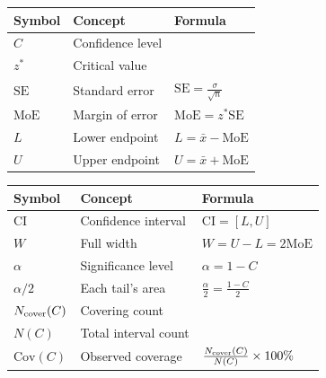\begingroup
\small
\setlength{\tabcolsep}{3pt}
\setlength{\extrarowheight}{0pt}
\setlength{\parskip}{0pt}
\renewcommand{\arraystretch}{1}
\noindent\begin{minipage}[t]{.49\linewidth}
\vspace{0pt}
\begin{tabularx}{\linewidth}{@{}>{\raggedright\arraybackslash}p{.21\linewidth}>{\raggedright\arraybackslash}p{.34\linewidth}>{\raggedright\arraybackslash}X@{}}
\toprule
\textbf{Symbol} & \textbf{Concept} & \textbf{Formula} \\
\midrule
$C$ & Confidence level & \\
$z^*$ & Critical value & \\
$\mathrm{SE}$ & Standard error & $\mathrm{SE}=\frac{\sigma}{\sqrt n}$ \\
$\mathrm{MoE}$ & Margin of error & $\mathrm{MoE}=z^*\mathrm{SE}$ \\
$L$ & Lower endpoint & $L=\bar{x}-\mathrm{MoE}$ \\
$U$ & Upper endpoint & $U=\bar{x}+\mathrm{MoE}$ \\
\bottomrule
\end{tabularx}\par
\end{minipage}\hfill
\begin{minipage}[t]{.49\linewidth}
\vspace{0pt}
\begin{tabularx}{\linewidth}{@{}>{\raggedright\arraybackslash}p{.21\linewidth}>{\raggedright\arraybackslash}p{.34\linewidth}>{\raggedright\arraybackslash}X@{}}
\toprule
\textbf{Symbol} & \textbf{Concept} & \textbf{Formula} \\
\midrule
$\mathrm{CI}$ & Confidence interval & $\mathrm{CI}=[L,U]$ \\
$W$ & Full width & $W=U-L=2\mathrm{MoE}$ \\
$\alpha$ & Significance level & $\alpha=1-C$ \\
$\alpha/2$ & Each tail's area & $\frac{\alpha}{2}=\frac{1-C}{2}$ \\
$N_{\rm cover}(C)$ & Covering count & \\
$N(C)$ & Total interval count & \\
$\mathrm{Cov}(C)$ & Observed coverage & $\frac{N_{\rm cover}(C)}{N(C)}\times100\%$ \\
\bottomrule
\end{tabularx}\par
\end{minipage}\par
